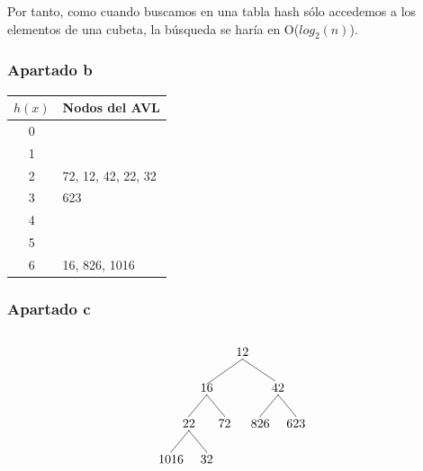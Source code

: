 \documentclass[10pt,a4paper,spanish]{report}
\begin{document}
\noindent
Por tanto, como cuando buscamos en una tabla hash sólo accedemos a los elementos de una cubeta, la búsqueda se haría en O($log_2 (n)$).

\subsubsection{\textcolor[rgb]{0.5,0.8,1}Apartado b}
\noindent
\begin{tabular}{c|l}
$h(x)$ & Nodos del AVL \\
\hline
0 & \\
1 & \\
2 & 72, 12, 42, 22, 32 \\
3 & 623 \\
4 & \\
5 & \\
6 & 16, 826, 1016 \\
\end{tabular}

\subsubsection{\textcolor[rgb]{0.5,0.8,1}Apartado c}
      \[\begin{xy}
      ,(0,0)*+=<10mm>[]\txt<2cm>{12}
      ,(-10,-10)*+=<10mm>[]\txt<2cm>{16}
      ,(10,-10)*+=<10mm>[]\txt<2cm>{42}
      ,(-15,-20)*+=<10mm>[]\txt<2cm>{22}
      ,(-5,-20)*+=<10mm>[]\txt<2cm>{72}
      ,(5,-20)*+=<10mm>[]\txt<2cm>{826}
      ,(15,-20)*+=<10mm>[]\txt<2cm>{623}
      ,(-20,-30)*+=<10mm>[]\txt<2cm>{1016}
      ,(-10,-30)*+=<10mm>[]\txt<2cm>{32}

      \ar@{-} (0,-2);(-10,-9) %
      \ar@{-} (0,-2);(9,-8) %
      \ar@{-} (-10,-12);(-15,-18) %
      \ar@{-} (10,-12);(5,-18)
      \ar@{-} (10,-12);(15,-18)
      \ar@{-} (-15,-22);(-20,-28)
      \ar@{-} (-15,-22);(-10,-28)
      \ar@{-} (-10,-12);(-5,-18)
      \end{xy}\]
\end{document}

